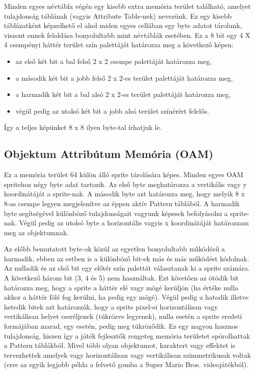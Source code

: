	Minden egyes névtábla végén egy kisebb extra memória terület található, amelyet tulajdonság táblának (vagyis Attribute Table-nek) nevezünk. Ez egy kisebb táblázatként képzelhető el ahol miden egyes cellában egy byte adatot tárolunk, viszont ennek feloldása bonyolultabb mint névtáblák esetében. Ez a 8 bit egy 4 X 4 csempényi háttér terület szín palettáját határozza meg a következő képen:
	
	\begin{itemize}
		\item az első két bit a bal felső 2 x 2 csempe palettáját határozza meg, 
		\item a második két bit a jobb felső 2 x 2-es terület palettáját határozza meg, 
		\item a harmadik két bit a bal alsó 2 x 2-es terület palettáját határozza meg,
		\item végül pedig az utolsó két bit a jobb alsó terület színérért felelős.
	\end{itemize}
	
	 Így a teljes képünket 8 x 8 ilyen byte-tal írhatjuk le. 
 
 	 \subsection{Objektum Attribútum Memória (OAM)}
 	 \label{sec:OAM-memory}
 	 Ez a memória terület 64 külön álló sprite tárolására képes. Minden egyes OAM spritehoz négy byte adat tartozik. Az első byte meghatározza a vertikális vagy y koordinátáját a sprite-nak. A második byte azt határozza meg, hogy melyik 8 x 8-as csempe legyen megjelenítve az éppen aktív Pattern táblából. A harmadik byte segítségével különböző tulajdonságait vagyunk képesek befolyásolni a sprite-nak. Végül pedig az utolsó byte a horizontális vagyis x koordinátáját határozzam meg az objektumnak.
 	 
 	 Az előbb bemutatott byte-ok közül az egyetlen bonyolultabb működésű a harmadik, ebben az estben is a különböző bit-ek más és más működést kódolnak.  Az nulladik és az első bit egy előtér szín palettát választanak ki a sprite számára. A következő három bit (3, 4 és 5) nem használtak. Ezt követően az ötödik bit határozza meg, hogy a sprite a háttér elé vagy mögé kerüljön (ha értéke nulla akkor a háttér fölé fog kerülni, ha pedig egy mögé). Végül pedig a hatodik illetve hetedik bitek azt határozzák, hogy a sprite pixel-ei horizontálisan vagy vertikálisan helyet cseréljenek (tükrözve legyenek), nulla esetén a sprite eredeti formájában marad, egy esetén, pedig meg tükröződik. Ez egy nagyon hasznos tulajdonság, hiszen így a játék fejlesztők rengeteg memória területet spórolhattak a Pattern táblákból. Mivel több olyan objektumot, karaktert vagy effektet is tervezhettek amelyek vagy horizontálisan vagy vertikálisan szimmetrikusak voltak (erre az egyik legjobb példa a felvető gomba  a Super Mario Bros. videojátékból).    
 	     
